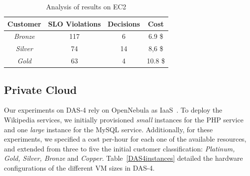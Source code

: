 


\begin{table}
  {\scriptsize 
\begin{center}
    \begin{tabular}{  | c | c | c | c |}
    \hline
         \textbf{Customer}  & \textbf{SLO Violations} & \textbf{Decisions}  & \textbf{Cost}  \\ \hline
   \textit{Bronze}   &  117 &  6 &  6.9 \$ \\ \hline   
   \textit{Silver}  &  74 &  14 &  8,6 \$ \\ \hline   
\textit{Gold} &   63  &  4 &  10.8 \$  \\ \hline   

 \end{tabular}
\end{center}
\caption{Analysis of results on EC2}
\label{summaryEC2}
}
\end{table}






\subsection{Private Cloud}

Our experiments on DAS-4 rely on OpenNebula as IaaS~\cite{sotomayor_virtual_2009}. To deploy the Wikipedia services, we initially provisioned \emph{small} instances for the PHP service and one \emph{large} instance for the MySQL service. Additionally, for these experiments, we specified a cost per-hour for each one of the available resources, and extended from three to five the initial customer classification: \emph{Platinum, Gold, Silver, Bronze} and \emph{Copper}. Table~\ref{DAS4instances} detailed the hardware configurations of the different VM sizes in DAS-4.

